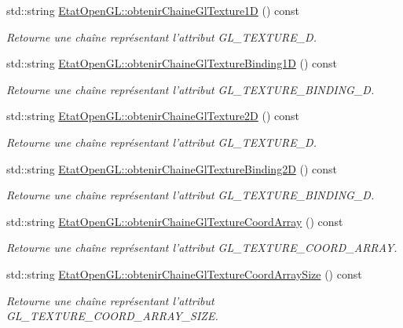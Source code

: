 \begin{DoxyCompactItemize}
std\-::string \hyperlink{group__utilitaire_ga60712e8970d469ba28a61541933011c4}{Etat\-Open\-G\-L\-::obtenir\-Chaine\-Gl\-Texture1\-D} () const 
\begin{DoxyCompactList}\small\item\em Retourne une chaîne représentant l'attribut G\-L\-\_\-\-T\-E\-X\-T\-U\-R\-E\-\_\-D. \end{DoxyCompactList}\item 
std\-::string \hyperlink{group__utilitaire_ga6ef71bae62c28f023f69aa0838ef1b31}{Etat\-Open\-G\-L\-::obtenir\-Chaine\-Gl\-Texture\-Binding1\-D} () const 
\begin{DoxyCompactList}\small\item\em Retourne une chaîne représentant l'attribut G\-L\-\_\-\-T\-E\-X\-T\-U\-R\-E\-\_\-\-B\-I\-N\-D\-I\-N\-G\-\_\-D. \end{DoxyCompactList}\item 
std\-::string \hyperlink{group__utilitaire_ga9c4d303e8a354ddb4678796eaceb45c6}{Etat\-Open\-G\-L\-::obtenir\-Chaine\-Gl\-Texture2\-D} () const 
\begin{DoxyCompactList}\small\item\em Retourne une chaîne représentant l'attribut G\-L\-\_\-\-T\-E\-X\-T\-U\-R\-E\-\_\-D. \end{DoxyCompactList}\item 
std\-::string \hyperlink{group__utilitaire_ga308bae30bed330cc281e0f2443cb43d2}{Etat\-Open\-G\-L\-::obtenir\-Chaine\-Gl\-Texture\-Binding2\-D} () const 
\begin{DoxyCompactList}\small\item\em Retourne une chaîne représentant l'attribut G\-L\-\_\-\-T\-E\-X\-T\-U\-R\-E\-\_\-\-B\-I\-N\-D\-I\-N\-G\-\_\-D. \end{DoxyCompactList}\item 
std\-::string \hyperlink{group__utilitaire_ga6e3e42a091a09f20c4885d62bd29d1fb}{Etat\-Open\-G\-L\-::obtenir\-Chaine\-Gl\-Texture\-Coord\-Array} () const 
\begin{DoxyCompactList}\small\item\em Retourne une chaîne représentant l'attribut G\-L\-\_\-\-T\-E\-X\-T\-U\-R\-E\-\_\-\-C\-O\-O\-R\-D\-\_\-\-A\-R\-R\-A\-Y. \end{DoxyCompactList}\item 
std\-::string \hyperlink{group__utilitaire_ga874c08bb1dab5bf56279fa496f347017}{Etat\-Open\-G\-L\-::obtenir\-Chaine\-Gl\-Texture\-Coord\-Array\-Size} () const 
\begin{DoxyCompactList}\small\item\em Retourne une chaîne représentant l'attribut G\-L\-\_\-\-T\-E\-X\-T\-U\-R\-E\-\_\-\-C\-O\-O\-R\-D\-\_\-\-A\-R\-R\-A\-Y\-\_\-\-S\-I\-Z\-E. \end{DoxyCompactList}\item 

\end{DoxyCompactItemize}

